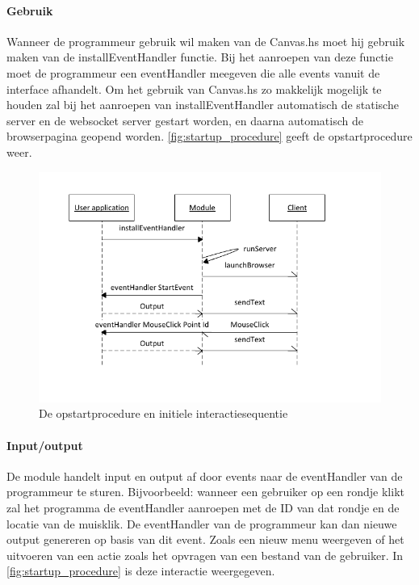 \paragraph{Gebruik} Wanneer de programmeur gebruik wil maken van de Canvas.hs moet hij gebruik maken van de installEventHandler functie. Bij het aanroepen van deze functie moet de programmeur een eventHandler meegeven die alle events vanuit de interface afhandelt. Om het gebruik van Canvas.hs zo makkelijk mogelijk te houden zal bij het aanroepen van installEventHandler automatisch de statische server en de websocket server gestart worden, en daarna automatisch de browserpagina geopend worden. \autoref{fig:startup_procedure} geeft de opstartprocedure weer.

\begin{figure}
\begin{center}
\includegraphics[keepaspectratio,width=\textwidth]{./images/module_startup_procedure_interaction.pdf}
\caption{De opstartprocedure en initiele interactiesequentie}
\label{fig:startup_procedure}
\end{center}
\end{figure}

\paragraph{Input/output}
De module handelt input en output af door events naar de eventHandler van de programmeur te sturen. Bijvoorbeeld: wanneer een gebruiker op een rondje klikt zal het programma de eventHandler aanroepen met de ID van dat rondje en de locatie van de muisklik. De eventHandler van de programmeur kan dan nieuwe output genereren op basis van dit event. Zoals een nieuw menu weergeven of het uitvoeren van een actie zoals het opvragen van een bestand van de gebruiker. In \autoref{fig:startup_procedure} is deze interactie weergegeven.

